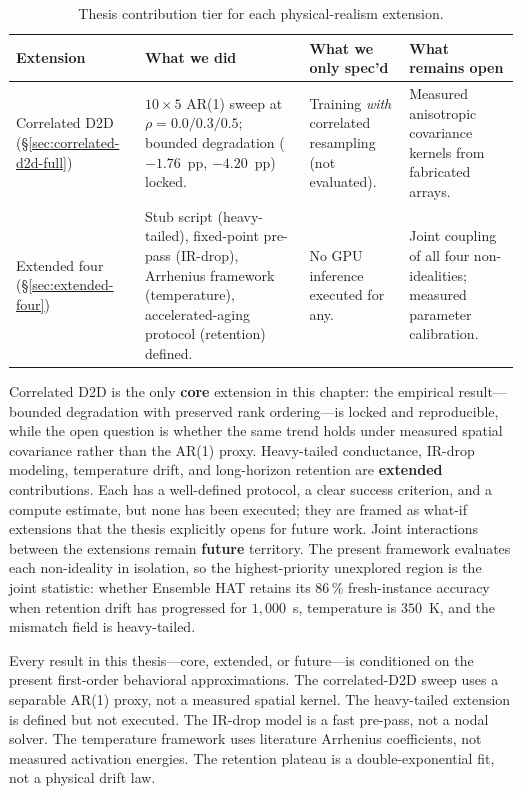 \begin{table}[ht]
    \centering
    \caption{Thesis contribution tier for each physical-realism extension.}
    \label{tab:tier-mapping}
    \small
    \setlength{\tabcolsep}{4pt}
    \begin{tabularx}{\textwidth}{@{}>{\raggedright\arraybackslash}X>{\raggedright\arraybackslash}X>{\raggedright\arraybackslash}X>{\raggedright\arraybackslash}X@{}}
        \toprule
        \textbf{Extension} & \textbf{What we did} & \textbf{What we only spec'd} & \textbf{What remains open} \\
        \midrule
        Correlated D2D (\S\ref{sec:correlated-d2d-full}) & $10 \times 5$ AR(1) sweep at $\rho=0.0/0.3/0.5$; bounded degradation ($-1.76$~pp, $-4.20$~pp) locked. & Training \emph{with} correlated resampling (not evaluated). & Measured anisotropic covariance kernels from fabricated arrays. \\
        \addlinespace
        Extended four (\S\ref{sec:extended-four}) & Stub script (heavy-tailed), fixed-point pre-pass (IR-drop), Arrhenius framework (temperature), accelerated-aging protocol (retention) defined. & No GPU inference executed for any. & Joint coupling of all four non-idealities; measured parameter calibration. \\
        \bottomrule
    \end{tabularx}
\end{table}

Correlated D2D is the only \textbf{core} extension in this chapter: the empirical result---bounded degradation with preserved rank ordering---is locked and reproducible, while the open question is whether the same trend holds under measured spatial covariance rather than the AR(1) proxy.  Heavy-tailed conductance, IR-drop modeling, temperature drift, and long-horizon retention are \textbf{extended} contributions.  Each has a well-defined protocol, a clear success criterion, and a compute estimate, but none has been executed; they are framed as what-if extensions that the thesis explicitly opens for future work.  Joint interactions between the extensions remain \textbf{future} territory.  The present framework evaluates each non-ideality in isolation, so the highest-priority unexplored region is the joint statistic: whether Ensemble HAT retains its $86\,\%$ fresh-instance accuracy when retention drift has progressed for $1{,}000$~s, temperature is $350$~K, and the mismatch field is heavy-tailed.

Every result in this thesis---core, extended, or future---is conditioned on the present first-order behavioral approximations.  The correlated-D2D sweep uses a separable AR(1) proxy, not a measured spatial kernel.  The heavy-tailed extension is defined but not executed.  The IR-drop model is a fast pre-pass, not a nodal solver.  The temperature framework uses literature Arrhenius coefficients, not measured activation energies.  The retention plateau is a double-exponential fit, not a physical drift law.

